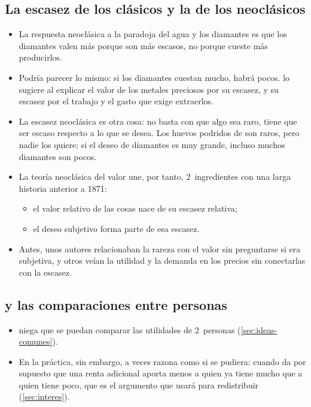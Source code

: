 \documentclass[11pt]{article}
\begin{document}
\subsection{La escasez de los clásicos y la de los neoclásicos}\label{anexo:escasez}

\begin{itemize}
\item La respuesta neoclásica a la paradoja del agua y los diamantes es que los diamantes valen más porque son más escasos, no porque cueste más producirlos\nocite{Fonseca2026Phases}.
\item Podría parecer lo mismo: si los diamantes cuestan mucho, habrá pocos.  lo sugiere al explicar el valor de los metales preciosos por su escasez, y su escasez por el trabajo y el gasto que exige extraerlos\nocite{Smith1776Wealth}.
\item La escasez neoclásica es otra cosa: no basta con que algo sea raro, tiene que ser escaso respecto a lo que se desea. Los huevos podridos de \textcite[cap.~III]{Robbins1932Essay} son raros, pero nadie los quiere; si el deseo de diamantes es muy grande, incluso muchos diamantes son pocos.
\item La teoría neoclásica del valor une, por tanto, 2~ingredientes con una larga historia anterior a 1871:
  \begin{itemize}
  \item el valor relativo de las cosas nace de su escasez relativa;
  \item el deseo subjetivo forma parte de esa escasez.
  \end{itemize}
\item Antes, unos autores relacionaban la rareza con el valor sin preguntarse si era subjetiva, y otros veían la utilidad y la demanda en los precios sin conectarlas con la escasez\nocite{Fonseca2026Phases}.
\end{itemize}

\subsection{ y las comparaciones entre personas}\label{anexo:comparaciones}

\begin{itemize}
\item {} niega que se puedan comparar las utilidades de 2~personas (\ref{sec:ideas-comunes}).
\item En la práctica, sin embargo, a veces razona como si se pudiera: cuando da por supuesto que una renta adicional aporta menos a quien ya tiene mucho que a quien tiene poco, que es el argumento que  usará para redistribuir (\ref{sec:interes}).
\end{itemize}
\end{document}
